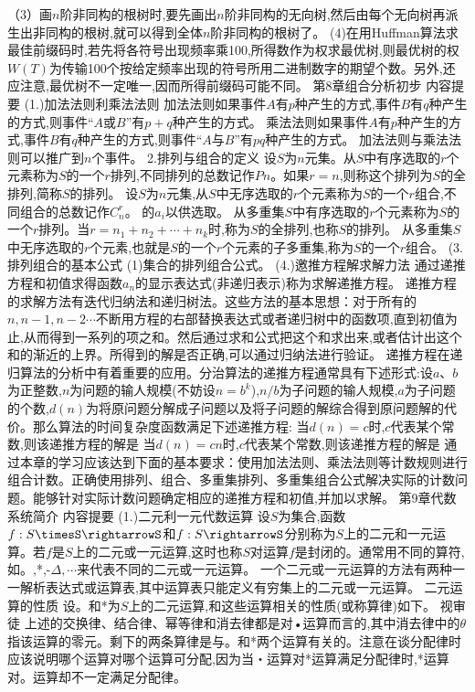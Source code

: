 （3）画$n$阶非同构的根树时,要先画出$n$阶非同构的无向树,然后由每个无向树再派生出非同构的根树,就可以得到全体$n$阶非同构的根树了。
(4)在用Huffman算法求最佳前缀码时,若先将各符号出现频率乘100,所得数作为权求最优树,则最优树的权$W(T)$为传输100个按给定频率出现的符号所用二进制数字的期望个数。另外,还应注意,最优树不一定唯一,因而所得前缀码可能不同。
{第8章组合分析初步}
{内容提要}
{(1.)加法法则利乘法法则}
加法法则如果事件$A$有$p$种产生的方式,事件$B$有$q$种产生的方式,则事件“$A$或$B$”有$p+q$种产生的方式。
乘法法则如果事件$A$有$p$种产生的方式,事件$B$有$q$种产生的方式,则事件“$A$与$B$”有$pq$种产生的方式。
加法法则与乘法法则可以推广到$n$个事件。
{2.排列与组合的定义}
设$S$为$n$元集。从$S$中有序选取的$r$个元素称为$S$的一个$r$排列,不同排列的总数记作$Pn$。如果$r=n$,则称这个排列为$S$的全排列,简称$S$的排列。
设$S$为$n$元集,从$S$中无序选取的$r$个元素称为$S$的一个$r$组合,不同组合的总数记作$C_{n}^{r}$。
的$a_{i}$以供选取。
从多重集$S$中有序选取的$r$个元素称为$S$的一个$r$排列。当$r=n_{1}+n_{2}+\cdots+n_{k}$时,称为$S$的全排列,也称$S$的排列。
从多重集$S$中无序选取的$r$个元素,也就是$S$的一个$r$个元素的子多重集,称为$S$的一个$r$组合。
(3.排列组合的基本公式
(1)集合的排列组合公式。
{(4.)邀推方程解求解力法}
通过递推方程和初值求得函数$a_{n}$的显示表达式(非递归表示)称为求解递推方程。
递推方程的求解方法有迭代归纳法和递归树法。这些方法的基本思想：对于所有的$n,n-1,n-2\cdots$不断用方程的右部替换表达式或者递归树中的函数项,直到初值为止,从而得到一系列的项之和。然后通过求和公式把这个和求出来,或者估计出这个和的渐近的上界。所得到的解是否正确,可以通过归纳法进行验证。
递推方程在递归算法的分析中有着重要的应用。分治算法的递推方程通常具有下述形式:设$a、b$为正整数,$n$为问题的输人规模(不妨设$n=b^{k}$),$n/b$为子问题的输人规模,$a$为子问题的个数,$d(n)$为将原问题分解成子问题以及将子问题的解综合得到原问题解的代价。那么算法的时间复杂度函数满足下述递推方程:
当$d(n)=c$时,$c$代表某个常数,则该递推方程的解是
当$d(n)=cn$时,$c$代表某个常数,则该递推方程的解是
通过本章的学习应该达到下面的基本要求：使用加法法则、乘法法则等计数规则进行组合计数。正确使用排列、组合、多重集排列、多重集组合公式解决实际的计数问题。能够针对实际计数问题确定相应的递推方程和初值,并加以求解。
{第9章代数系统简介}
{内容提要}
{(1.)二元利一元代数运算}
设$S$为集合,函数$f:S\timesS\rightarrowS$和$f:S\rightarrowS$分别称为$S$上的二元和一元运算。若$f$是$S$上的二元或一元运算,这时也称$S$对运算$f$是封闭的。通常用不同的算符,如。,*,-$\Delta,\cdots$来代表不同的二元或一元运算。
一个二元或一元运算的方法有两种一一解析表达式或运算表,其中运算表只能定义有穷集上的二元或一元运算。
二元运算的性质
设。和*为$S$上的二元运算,和这些运算相关的性质(或称算律)如下。
视审徒
上述的交换律、结合律、幂等律和消去律都是对•运算而言的,其中消去律中的$\theta$指该运算的零元。剩下的两条算律是与。和*两个运算有关的。注意在谈分配律时应该说明哪个运算对哪个运算可分配,因为当・运算对*运算满足分配律时,*运算对。运算却不一定满足分配律。
